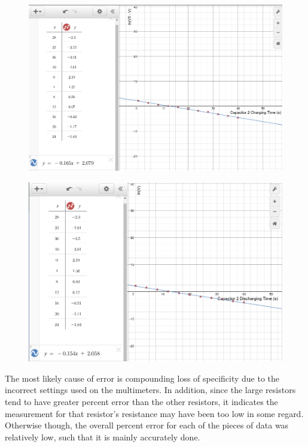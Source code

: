 \documentclass[11pt, titlepage]{article}
\begin{document}
\begin{figure}[h]
\centering
\hspace*{0cm}
\includegraphics[scale=0.45]{graph33.jpg}
\vspace*{0cm}
\end{figure}

\begin{figure}[h]
\centering
\hspace*{0cm}
\includegraphics[scale=0.5]{graph34.jpg}
\vspace*{0cm}
\end{figure}

The most likely cause of error is compounding loss of specificity due to the incorrect settings used on the multimeters. In addition, since the large resistors tend to have greater percent error than the other resistors, it indicates the measurement for that resistor's resistance may have been too low in some regard. Otherwise though, the overall percent error for each of the pieces of data was relatively low, such that it is mainly accurately done.
\end{document}
